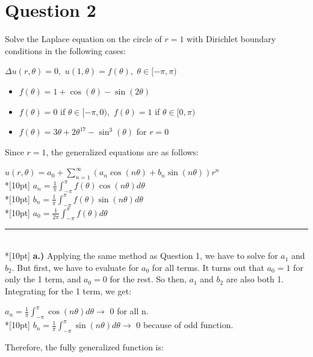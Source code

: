 \documentclass{article}
\begin{document}
\clearpage \noindent
\section{Question 2}
Solve the Laplace equation on the circle of \(r = 1\) with Dirichlet boundary conditions in the following cases:
\begin{center}
    \(\Delta u(r, \theta) = 0, \,\, u(1, \theta) = f(\theta), \,\, \theta \in [-\pi, \pi)\)
\end{center}
\begin{itemize}
    \item \(f(\theta) = 1 + \cos (\theta) - \sin(2\theta)\)
    \item \(f(\theta) = 0\) if \(\theta \in [-\pi, 0), \,\, f(\theta) = 1\) if \(\theta \in [0, \pi)\)
    \item \(f(\theta) = 3\theta + 2\theta^{17} - \sin^3(\theta)\) for \(r = 0\)
\end{itemize}
Since \(r = 1\), the generalized equations are as follows:
\begin{center}
    \(\displaystyle u(r, \theta) = a_0 + \sum_{n = 1}^{\infty}(a_n\cos(n\theta) + b_n\sin(n\theta))r^n\)\\*[10pt]
    \(\displaystyle a_n = \frac{1}{\pi}\int_{-\pi}^{\pi}f(\theta)\cos(n\theta)d\theta\)\\*[10pt]
    \(\displaystyle b_n = \frac{1}{\pi}\int_{-\pi}^{\pi}f(\theta)\sin(n\theta)d\theta\)\\*[10pt]
    \(\displaystyle a_0 = \frac{1}{2\pi}\int_{-\pi}^{\pi}f(\theta)d\theta\)
\end{center}
\rule{\linewidth}{0.2mm}\\*[10pt]
\textbf{a.)} Applying the same method as Question 1, we have to solve for \(a_1\) and \(b_2\). But first, we have to evaluate for \(a_0\) for all terms. It turns out that \(a_0 = 1\) for only the 1 term, and \(a_0 = 0\) for the rest. So then, \(a_1\) and \(b_2\) are also both 1. Integrating for the 1 term, we get:
\begin{center}
    \(\displaystyle a_n = \frac{1}{\pi}\int_{-\pi}^{\pi}\cos(n\theta)d\theta\rightarrow\) 0 for all n.\\*[10pt]
    \(\displaystyle b_n = \frac{1}{\pi}\int_{-\pi}^{\pi}\sin(n\theta)d\theta\rightarrow\) 0 because of odd function.
\end{center}
Therefore, the fully generalized function is:
\begin{center}
\end{center}
\end{document}
